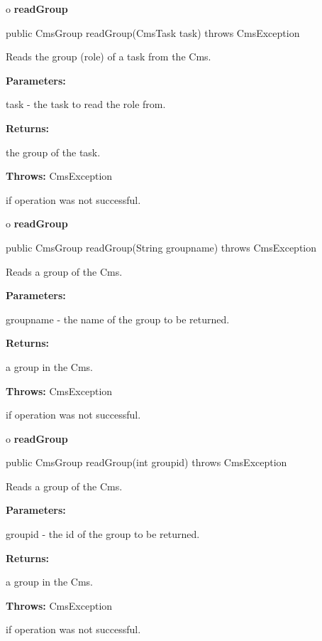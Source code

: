 o {\bf readGroup} 

\begin{PRE}
 public CmsGroup readGroup(CmsTask task) throws CmsException
\end{PRE}

\begin{description}
\htmlDD Reads the group (role) of a task from the Cms. 

\begin{description}
\item {\bf Parameters:}  

task - the task to read the role from.  
\item {\bf Returns:}  

the group of the task.  
\item {\bf Throws:} CmsException  

if operation was not successful.  
\end{description}

\end{description}

o {\bf readGroup} 

\begin{PRE}
 public CmsGroup readGroup(String groupname) throws CmsException
\end{PRE}

\begin{description}
\htmlDD Reads a group of the Cms. 

\begin{description}
\item {\bf Parameters:}  

groupname - the name of the group to be returned.  
\item {\bf Returns:}  

a group in the Cms.  
\item {\bf Throws:} CmsException  

if operation was not successful.  
\end{description}

\end{description}

o {\bf readGroup} 

\begin{PRE}
 public CmsGroup readGroup(int groupid) throws CmsException
\end{PRE}

\begin{description}
\htmlDD Reads a group of the Cms. 

\begin{description}
\item {\bf Parameters:}  

groupid - the id of the group to be returned.  
\item {\bf Returns:}  

a group in the Cms.  
\item {\bf Throws:} CmsException  

if operation was not successful.  
\end{description}

\end{description}

